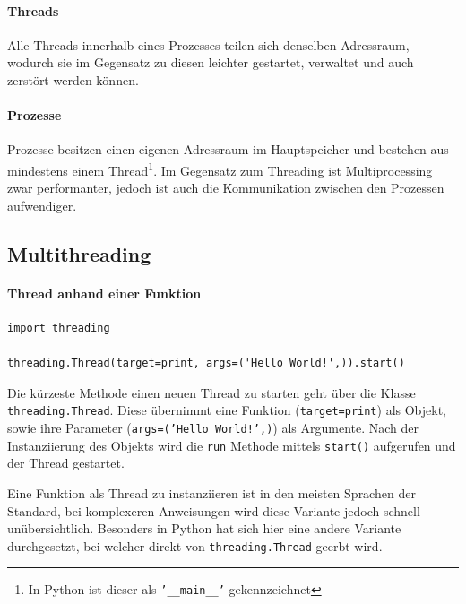 \documentclass[a4paper,11pt]{article}
\begin{document}
\paragraph{Threads}
Alle Threads innerhalb eines Prozesses teilen sich denselben Adressraum, wodurch sie im Gegensatz zu diesen leichter gestartet, verwaltet und auch zerst\"ort werden k\"onnen.

\paragraph{Prozesse}
Prozesse besitzen einen eigenen Adressraum im Hauptspeicher und bestehen aus mindestens einem Thread\footnote{In Python ist dieser als \texttt{'__main__'} gekennzeichnet}.
Im Gegensatz zum Threading ist Multiprocessing zwar performanter, jedoch ist auch die Kommunikation zwischen den Prozessen aufwendiger.

\newpage
\subsection{Multithreading}

\paragraph{Thread anhand einer Funktion}
\begin{verbatim}
import threading

threading.Thread(target=print, args=('Hello World!',)).start()
\end{verbatim}

\begin{flushleft}
Die k\"urzeste Methode einen neuen Thread zu starten geht \"uber die Klasse \texttt{threading.Thread}.
Diese \"ubernimmt eine Funktion (\texttt{target=print}) als Objekt, sowie ihre Parameter (\texttt{args=('Hello World!',)}) als Argumente.
Nach der Instanziierung des Objekts wird die \texttt{run} Methode mittels \texttt{start()} aufgerufen und der Thread gestartet.
\end{flushleft}
Eine Funktion als Thread zu instanziieren ist in den meisten Sprachen der Standard, bei komplexeren Anweisungen wird diese Variante jedoch schnell un\"ubersichtlich.
Besonders in Python hat sich hier eine andere Variante durchgesetzt, bei welcher direkt von \texttt{threading.Thread} geerbt wird.
\end{document}
